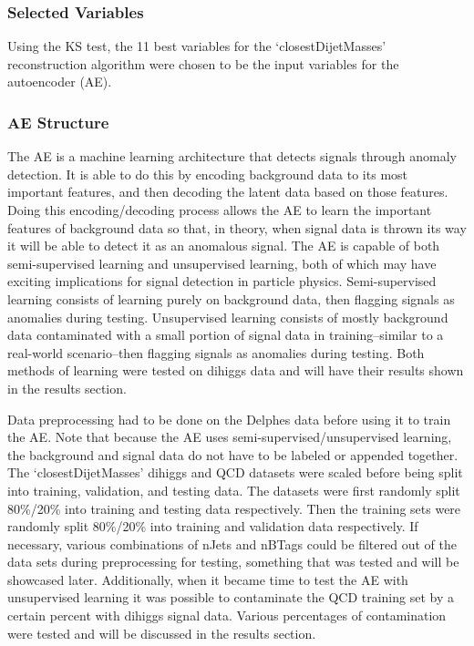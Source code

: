 \label{sec:AE}
\subsubsection{Selected Variables}
Using the KS test, the 11 best variables for the ‘closestDijetMasses’ reconstruction algorithm were chosen to be the input variables for the autoencoder (AE). 

\subsubsection{AE Structure}
The AE is a machine learning architecture that detects signals through anomaly detection. It is able to do this by encoding background data to its most important features, and then decoding the latent data based on those features. Doing this encoding/decoding process allows the AE to learn the important features of background data so that, in theory, when signal data is thrown its way it will be able to detect it as an anomalous signal. The AE is capable of both semi-supervised learning and unsupervised learning, both of which may have exciting implications for signal detection in particle physics. Semi-supervised learning consists of learning purely on background data, then flagging signals as anomalies during testing. Unsupervised learning consists of mostly background data contaminated with a small portion of signal data in training--similar to a real-world scenario--then flagging signals as anomalies during testing. Both methods of learning were tested on dihiggs data and will have their results shown in the results section.

Data preprocessing had to be done on the Delphes data before using it to train the AE. Note that because the AE uses semi-supervised/unsupervised learning, the background and signal data do not have to be labeled or appended together. The ‘closestDijetMasses’ dihiggs and QCD datasets were scaled before being split into training, validation, and testing data. The datasets were first randomly split 80\%/20\% into training and testing data respectively. Then the training sets were randomly split 80\%/20\% into training and validation data respectively. If necessary, various combinations of nJets and nBTags could be filtered out of the data sets during preprocessing for testing, something that was tested and will be showcased later. Additionally, when it became time to test the AE with unsupervised learning it was possible to contaminate the QCD training set by a certain percent with dihiggs signal data. Various percentages of contamination were tested and will be discussed in the results section.

